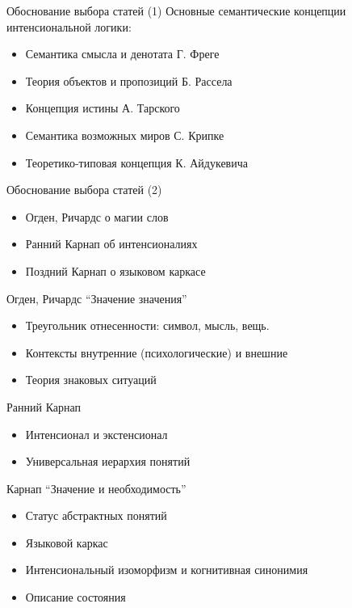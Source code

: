 \documentclass{beamer}
\begin{document}
\begin{frame}{Обоснование выбора статей (1)}
Основные семантические концепции интенсиональной логики:\\
  \begin{itemize}
    \item Семантика смысла и денотата Г. Фреге
    \item Теория объектов и пропозиций Б. Рассела
    \item Концепция истины А. Тарского
    \item Семантика возможных миров С. Крипке
    \item Теоретико-типовая концепция К. Айдукевича
  \end{itemize}
\end{frame}

\begin{frame}{Обоснование выбора статей (2)}
  \begin{itemize}
    \item Огден, Ричардс о магии слов
    \item Ранний Карнап об интенсионалиях
    \item Поздний Карнап о языковом каркасе
  \end{itemize}
\end{frame}


\begin{frame}{Огден, Ричардс ``Значение значения''}
  \begin{itemize}
    \item Треугольник отнесенности: символ, мысль, вещь.
    \item Контексты внутренние (психологические) и внешние
    \item Теория знаковых ситуаций
  \end{itemize}
\end{frame}

\begin{frame}{Ранний Карнап}
  \begin{itemize}
    \item Интенсионал и экстенсионал
    \item Универсальная иерархия понятий
  \end{itemize}
\end{frame}

\begin{frame}{Карнап ``Значение и необходимость''}
  \begin{itemize}
    \item Статус абстрактных понятий
    \item Языковой каркас
    \item Интенсиональный изоморфизм и когнитивная синонимия
    \item Описание состояния
  \end{itemize}
\end{frame}
\end{document}
